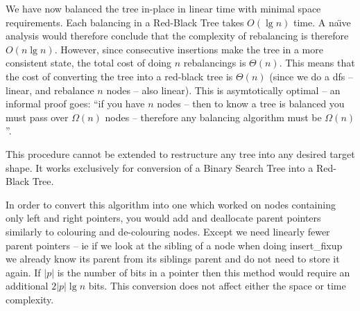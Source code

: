 \documentclass[10pt,\jkfside,a4paper]{article}
\begin{document}
\begin{enumerate}
\begin{enumerate}
\begin{center}
\end{center}

We have now balanced the tree in-place in linear time with minimal space requirements.
Each balancing in a Red-Black Tree takes $O(\lg n)$ time. A na\"{\i}ve analysis would therefore conclude that the
complexity of rebalancing is therefore $O(n \lg n)$. However, since consecutive insertions make the tree in a 
more consistent state, the total cost of doing $n$ rebalancings is $\Theta(n)$. This means that the cost of 
converting the tree into a red-black tree is $\Theta(n)$ (since we do a dfs -- linear, and rebalance $n$ nodes -- 
also linear). This is asymtotically optimal -- an informal proof goes: ``if you have $n$ nodes -- then to know a tree 
is balanced you must pass over $\Omega(n)$ nodes -- therefore any balancing algorithm must be $\Omega(n)$''.

This procedure cannot be extended to restructure any tree into any desired target shape. It works 
exclusively for conversion of a Binary Search Tree into a Red-Black Tree.

In order to convert this algorithm into one which worked on nodes containing only left and right pointers, 
you would add and deallocate parent pointers similarly to colouring and de-colouring nodes. Except we 
need linearly fewer parent pointers -- ie if we look at the sibling of a node 
when doing insert\_fixup we already know its parent from its siblings parent and do not need to store it again. 
If $|p|$ is the number of bits in a pointer then this method would require an additional $2|p|\lg n$ bits. 
This conversion does not affect either the space or time complexity. 


\end{enumerate}
\end{enumerate}
\end{document}
